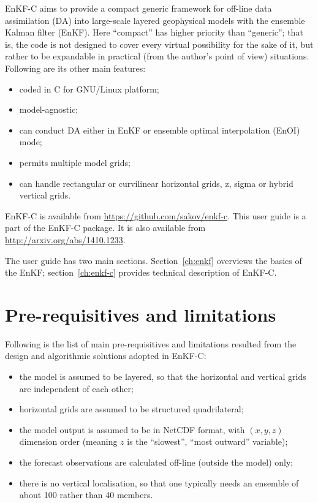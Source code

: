 \documentclass[11pt]{report}
\begin{document}
EnKF-C aims to provide a compact generic framework for off-line data assimilation (DA) into large-scale layered geophysical models with the ensemble Kalman filter (EnKF).
Here ``compact'' has higher priority than ``generic''; that is, the code is not designed to cover every virtual possibility for the sake of it, but rather to be expandable in practical (from the author's point of view) situations.
Following are its other main features:
\begin{itemize}
\item coded in C for GNU/Linux platform;
\item model-agnostic;
\item can conduct DA either in EnKF or ensemble optimal interpolation (EnOI) mode;
\item permits multiple model grids;
\item can handle rectangular or curvilinear horizontal grids, z, sigma or hybrid vertical grids.
\end{itemize}

EnKF-C is available from \url{https://github.com/sakov/enkf-c}.
This user guide is a part of the EnKF-C package. 
It is also available from \url{http://arxiv.org/abs/1410.1233}.

The user guide has two main sections.
Section~\ref{ch:enkf} overviews the basics of the EnKF; section~\ref{ch:enkf-c} provides technical description of EnKF-C.

\section*{Pre-requisitives and limitations}

Following is the list of main pre-requisitives and limitations resulted from the design and algorithmic solutions adopted in EnKF-C:
\begin{itemize}
\item the model is assumed to be layered, so that the horizontal and vertical grids are independent of each other;
\item horizontal grids are assumed to be structured quadrilateral;
\item the model output is assumed to be in NetCDF format, with $(x, y, z)$ dimension order (meaning $z$ is the ``slowest'', ``most outward'' variable);
\item the forecast observations are calculated off-line (outside the model) only;
\item there is no vertical localisation, so that one typically needs an ensemble of about 100 rather than 40 members.
\end{itemize}
\end{document}

